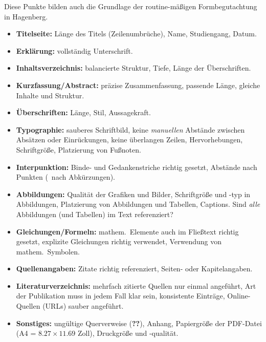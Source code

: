 Diese Punkte bilden auch die Grundlage der routine-mäßigen
Formbegutachtung in Hagenberg.

\begin{itemize}
\tightlist
\item
  \textbf{Titelseite:} Länge des Titels (Zeilenumbrüche), Name,
  Studiengang, Datum.
\item
  \textbf{Erklärung:} vollständig Unterschrift.
\item
  \textbf{Inhaltsverzeichnis:} balancierte Struktur, Tiefe, Länge der
  Überschriften.
\item
  \textbf{Kurzfassung/Abstract:} präzise Zusammenfassung, passende
  Länge, gleiche Inhalte und Struktur.
\item
  \textbf{Überschriften:} Länge, Stil, Aussagekraft.
\item
  \textbf{Typographie:} sauberes Schriftbild, keine \emph{manuellen}
  Abstände zwischen Absätzen oder Einrückungen, keine überlangen Zeilen,
  Hervorhebungen, Schriftgröße, Platzierung von Fußnoten.
\item
  \textbf{Interpunktion:} Binde- und Gedankenstriche richtig gesetzt,
  Abstände nach Punkten (\va~nach Abkürzungen).
\item
  \textbf{Abbildungen:} Qualität der Grafiken und Bilder, Schriftgröße
  und -typ in Abbildungen, Platzierung von Abbildungen und Tabellen,
  Captions. Sind \emph{alle} Abbildungen (und Tabellen) im Text
  referenziert?
\item
  \textbf{Gleichungen/Formeln:} mathem.~Elemente auch im Fließtext
  richtig gesetzt, explizite Gleichungen richtig verwendet, Verwendung
  von mathem.~Symbolen.
\item
  \textbf{Quellenangaben:} Zitate richtig referenziert, Seiten- oder
  Kapitelangaben.
\item
  \textbf{Literaturverzeichnis:} mehrfach zitierte Quellen nur einmal
  angeführt, Art der Publikation muss in jedem Fall klar sein,
  konsistente Einträge, Online-Quellen (URLs) sauber angeführt.
\item
  \textbf{Sonstiges:} ungültige Querverweise (\textbf{??}), Anhang,
  Papiergröße der PDF-Datei (A4 = \(8.27 \times 11.69\) Zoll),
  Druckgröße und -qualität.
\end{itemize}
